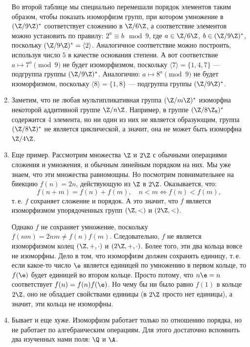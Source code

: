 \begin{enumerate}
Во второй таблице мы специально перемешали порядок элементов таким образом, чтобы показать изоморфизм групп, при котором умножение в $(\Z/9\Z)^*$ соответствует сложению в $\Z/6\Z$, а соответствие элементов можно установить по правилу: $2^a\equiv b\mod 9$, где $a\in\Z/6\Z$, $b\in(\Z/9\Z)^*$, поскольку $(\Z/9\Z)^*=\langle 2\rangle$. Аналогичное соответствие можно построить, используя число $5$ в качестве основания степени. А вот соответствие $a\mapsto 7^a\pmod 9$ не будет изоморфизмом, поскольку $\langle 7\rangle=\{1,4,7\}$ --- подгруппа группы $(\Z/9\Z)^*$. Аналогично: $a\mapsto 8^a\pmod 9$ не будет изоморфизмом, поскольку $\langle 8\rangle=\{1,8\}$ --- подгруппа группы $(\Z/9\Z)^*$.

\item Заметим, что не любая мультипликативная группа $(\Z/m\Z)^*$ изоморфна некоторой аддитивной группе $\Z/n\Z$. Например, в группе $(\Z/8\Z_8)^*$ содержится 4 элемента, но ни один из них не является образующим, группа $(\Z/8\Z)^*$ не является циклической, а значит, она не может быть изоморфна $\Z/4\Z$.

\item Еще пример. Рассмотрим множества $\Z$ и $2\Z$ с обычными операциями сложения и умножения, и обычным линейным порядком на них. Мы уже знаем, что эти множества равномощны. Но посмотрим повнимательнее на биекцию $f(n)=2n$, действующую из $\Z$ в $2\Z$. Оказывается, что:
$$
f(n+m)=f(n)+f(m),\quad n<m\Leftrightarrow f(n)<f(m),
$$
т.\,е. $f$ сохраняет сложение и порядок. А это значит, что $f$ является изоморфизмом упорядоченных групп $(\Z,<)$ и $(2\Z,<)$.

Однако $f$ не сохраняет умножение, поскольку $f(nm)=2nm\ne f(n)f(m)$. Следовательно, $f$ не является изоморфизмом колец $(\Z,+,\cdot)$ и $(2\Z,+,\cdot)$. Более того, эти два кольца вовсе не изоморфны. Дело в том, что изоморфизм должен сохранять единицу, т.\,е. если какое-то число $\e$ является единицей по умножению в первом кольце, то $f(\e)$ будет единицей во втором кольце. Просто потому, что $n\e=n$ соответствует $f(n)=f(n)f(\e)$. Но чему бы ни было равно $f(1)$ в кольце $2\Z$, оно не обладает свойствами единицы (в $2\Z$ просто нет единицы), а значит, эти кольца не изоморфны.
\item Бывает и еще хуже. Изоморфизм работает только по отношению порядка, но не работает по алгебраическим операциям. Для этого достаточно вспомнить два изученных нами поля: $\Q$ и $\A$.


\end{enumerate}
